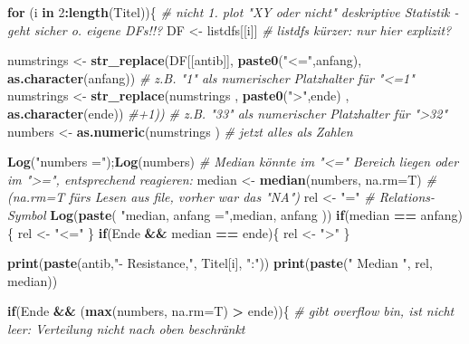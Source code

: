 \documentclass[
]{article}
\newenvironment{Shaded}{\begin{snugshade}}{\end{snugshade}}
\newcommand{\CommentTok}[1]{\textcolor[rgb]{0.56,0.35,0.01}{\textit{#1}}}
\newcommand{\ControlFlowTok}[1]{\textcolor[rgb]{0.13,0.29,0.53}{\textbf{#1}}}
\newcommand{\DataTypeTok}[1]{\textcolor[rgb]{0.13,0.29,0.53}{#1}}
\newcommand{\DecValTok}[1]{\textcolor[rgb]{0.00,0.00,0.81}{#1}}
\newcommand{\KeywordTok}[1]{\textcolor[rgb]{0.13,0.29,0.53}{\textbf{#1}}}
\newcommand{\NormalTok}[1]{#1}
\newcommand{\OperatorTok}[1]{\textcolor[rgb]{0.81,0.36,0.00}{\textbf{#1}}}
\newcommand{\StringTok}[1]{\textcolor[rgb]{0.31,0.60,0.02}{#1}}
\begin{document}
\begin{Shaded}
\begin{Highlighting}[]
  \ControlFlowTok{for}\NormalTok{ (i }\ControlFlowTok{in} \DecValTok{2}\OperatorTok{:}\KeywordTok{length}\NormalTok{(Titel))\{     }\CommentTok{# nicht 1. plot "XY oder nicht"  deskriptive Statistik - geht sicher o. eigene DFs!!? }
\NormalTok{    DF <-}\StringTok{ }\NormalTok{listdfs[[i]]            }\CommentTok{# listdfs kürzer: nur hier explizit?}
    
\NormalTok{    numstrings <-}\StringTok{ }\KeywordTok{str_replace}\NormalTok{(DF[[antib]], }\KeywordTok{paste0}\NormalTok{(}\StringTok{"<="}\NormalTok{,anfang),  }\KeywordTok{as.character}\NormalTok{(anfang))  }
    \CommentTok{# z.B. "1" als numerischer Platzhalter für "<=1" }
\NormalTok{    numstrings <-}\StringTok{ }\KeywordTok{str_replace}\NormalTok{(numstrings          , }\KeywordTok{paste0}\NormalTok{(}\StringTok{">"}\NormalTok{,ende)   , }\KeywordTok{as.character}\NormalTok{(ende)) }\CommentTok{#+1))   }
    \CommentTok{# z.B. "33" als numerischer Platzhalter für ">32"}
\NormalTok{    numbers <-}\StringTok{ }\KeywordTok{as.numeric}\NormalTok{(numstrings )      }\CommentTok{# jetzt alles als Zahlen                                                       }

    \KeywordTok{Log}\NormalTok{(}\StringTok{"numbers ="}\NormalTok{);}\KeywordTok{Log}\NormalTok{(numbers)}
    \CommentTok{# Median könnte im "<=" Bereich liegen oder im ">=", entsprechend reagieren:}
\NormalTok{    median <-}\StringTok{ }\KeywordTok{median}\NormalTok{(numbers, }\DataTypeTok{na.rm=}\NormalTok{T)  }\CommentTok{# (na.rm=T fürs Lesen aus file, vorher war das "NA")}
\NormalTok{    rel <-}\StringTok{ "="}                          \CommentTok{# Relations-Symbol}
    \KeywordTok{Log}\NormalTok{(}\KeywordTok{paste}\NormalTok{( }\StringTok{"median, anfang ="}\NormalTok{,median, anfang ))}
    \ControlFlowTok{if}\NormalTok{(median }\OperatorTok{==}\StringTok{ }\NormalTok{anfang)\{}
\NormalTok{      rel <-}\StringTok{ "<="} 
\NormalTok{    \} }
    \ControlFlowTok{if}\NormalTok{(Ende }\OperatorTok{&&}\StringTok{ }\NormalTok{median }\OperatorTok{==}\StringTok{ }\NormalTok{ende)\{}
\NormalTok{      rel <-}\StringTok{ ">"}
\NormalTok{    \} }

    \KeywordTok{print}\NormalTok{(}\KeywordTok{paste}\NormalTok{(antib,}\StringTok{"- Resistance,"}\NormalTok{, Titel[i], }\StringTok{":"}\NormalTok{))}
    \KeywordTok{print}\NormalTok{(}\KeywordTok{paste}\NormalTok{(}\StringTok{"  Median            "}\NormalTok{, rel, median))}
    
    \ControlFlowTok{if}\NormalTok{(Ende }\OperatorTok{&&}\StringTok{ }\NormalTok{(}\KeywordTok{max}\NormalTok{(numbers, }\DataTypeTok{na.rm=}\NormalTok{T) }\OperatorTok{>}\StringTok{ }\NormalTok{ende))\{  }\CommentTok{# gibt overflow bin, ist nicht leer: Verteilung nicht nach oben beschränkt}
                                                            

\end{Highlighting}
\end{Shaded}
\end{document}
